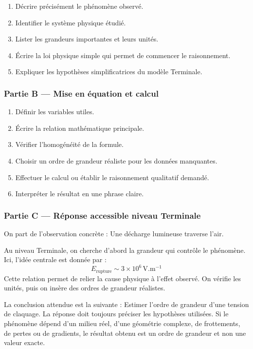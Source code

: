 \documentclass[11pt,a4paper]{article}
\begin{document}
\begin{enumerate}
  \item Décrire précisément le phénomène observé.
  \item Identifier le système physique étudié.
  \item Lister les grandeurs importantes et leurs unités.
  \item Écrire la loi physique simple qui permet de commencer le raisonnement.
  \item Expliquer les hypothèses simplificatrices du modèle Terminale.
\end{enumerate}

\subsubsection*{Partie B — Mise en équation et calcul}

\begin{enumerate}
  \item Définir les variables utiles.
  \item Écrire la relation mathématique principale.
  \item Vérifier l'homogénéité de la formule.
  \item Choisir un ordre de grandeur réaliste pour les données manquantes.
  \item Effectuer le calcul ou établir le raisonnement qualitatif demandé.
  \item Interpréter le résultat en une phrase claire.
\end{enumerate}

\subsubsection*{Partie C — Réponse accessible niveau Terminale}

\begin{corrigebox}
On part de l'observation concrète : Une décharge lumineuse traverse l'air.

Au niveau Terminale, on cherche d'abord la grandeur qui contrôle le phénomène. Ici, l'idée centrale est donnée par :
\[
E_{\mathrm{rupture}}\sim 3\times10^6\,\mathrm{V.m^{-1}}
\]
Cette relation permet de relier la cause physique à l'effet observé. On vérifie les unités, puis on insère des ordres de grandeur réalistes.

La conclusion attendue est la suivante : Estimer l'ordre de grandeur d'une tension de claquage. La réponse doit toujours préciser les hypothèses utilisées. Si le phénomène dépend d'un milieu réel, d'une géométrie complexe, de frottements, de pertes ou de gradients, le résultat obtenu est un ordre de grandeur et non une valeur exacte.
\end{corrigebox}
\end{document}
